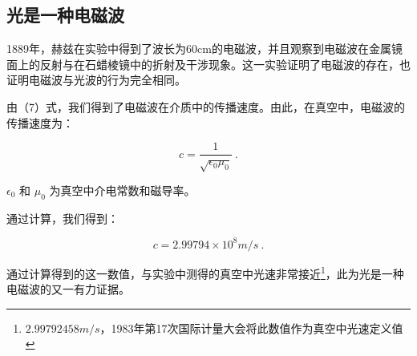 \subsection{光是一种电磁波}

1889年，赫兹在实验中得到了波长为60cm的电磁波，并且观察到电磁波在金属镜面上的反射与在石蜡棱镜中的折射及干涉现象。这一实验证明了电磁波的存在，也证明电磁波与光波的行为完全相同。

由（7）式，我们得到了电磁波在介质中的传播速度。由此，在真空中，电磁波的传播速度为：

\begin{equation}
c = \frac{1}{\sqrt{\epsilon_0 \mu_0}} ~.
\end{equation}

$\epsilon_0$ 和 $\mu_0$ 为真空中介电常数和磁导率。

通过计算，我们得到：

\begin{equation}
c = 2.99794 \times 10^8 m/s ~.
\end{equation}

通过计算得到的这一数值，与实验中测得的真空中光速非常接近\footnote{$2.99792458 m/s$，1983年第17次国际计量大会将此数值作为真空中光速定义值}，此为光是一种电磁波的又一有力证据。

\sub
